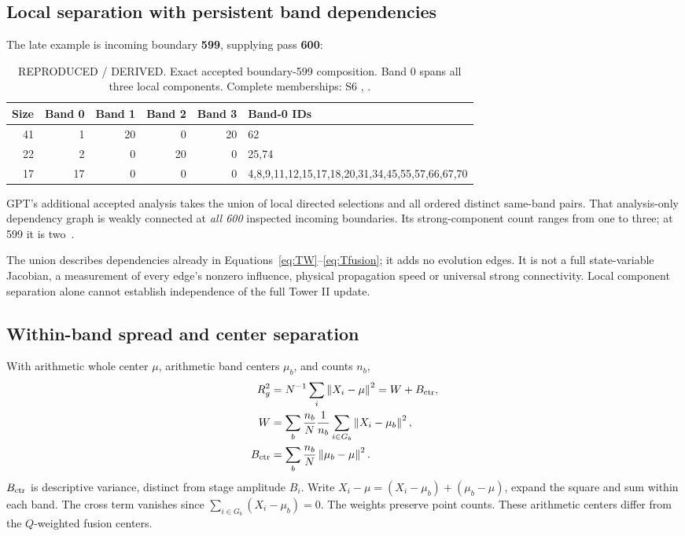 \documentclass[11pt,a4paper]{article}
\newcommand{\ev}[1]{\textsf{\small #1}}
\newcommand{\norm}[1]{\left\lVert #1\right\rVert}
\begin{document}
\subsection{Local separation with persistent band dependencies}
The late example is incoming boundary \textbf{599}, supplying pass \textbf{600}:
\begin{table}[H]\centering\small
\begin{tabularx}{\textwidth}{r rrrr X}\toprule
Size & Band 0 & Band 1 & Band 2 & Band 3 & Band-0 IDs\\\midrule
41 & 1 & 20 & 0 & 20 & 62\\
22 & 2 & 0 & 20 & 0 & 25,74\\
17 & 17 & 0 & 0 & 0 & 4,8,9,11,12,15,17,18,20,31,34,45,55,57,66,67,70\\
\bottomrule\end{tabularx}
\caption{\ev{REPRODUCED / DERIVED}. Exact accepted boundary-599 composition. Band 0 spans all three local components. Complete memberships: S6 \protect{}, \protect{}.}\label{tab:bridge}
\end{table}
GPT's additional accepted analysis takes the union of local directed selections and all ordered distinct same-band pairs. That analysis-only dependency graph is weakly connected at \emph{all 600} inspected incoming boundaries. Its strong-component count ranges from one to three; at 599 it is two~\citep{s6review}.

The union describes dependencies already in Equations~\eqref{eq:TW}--\eqref{eq:Tfusion}; it adds no evolution edges. It is not a full state-variable Jacobian, a measurement of every edge's nonzero influence, physical propagation speed or universal strong connectivity. Local component separation alone cannot establish independence of the full Tower II update.

\subsection{Within-band spread and center separation}
With arithmetic whole center \(\mu\), arithmetic band centers \(\mu_b\), and counts \(n_b\),
\begin{align}
R_g^2&=N^{-1}\sum_i\norm{X_i-\mu}^2=W+B_{\rm ctr},\label{eq:variance}\\
W&=\sum_b\frac{n_b}{N}\frac1{n_b}\sum_{i\in G_b}\norm{X_i-\mu_b}^2,\nonumber\\
B_{\rm ctr}&=\sum_b\frac{n_b}{N}\norm{\mu_b-\mu}^2.\nonumber
\end{align}
\(B_{\rm ctr}\) is descriptive variance, distinct from stage amplitude \(B_i\). Write \(X_i-\mu=(X_i-\mu_b)+(\mu_b-\mu)\), expand the square and sum within each band. The cross term vanishes since \(\sum_{i\in G_b}(X_i-\mu_b)=0\). The weights preserve point counts. These arithmetic centers differ from the \(Q\)-weighted fusion centers.
\end{document}
